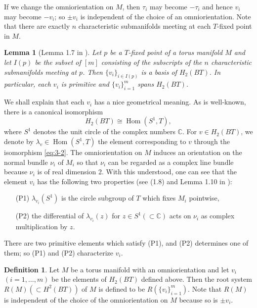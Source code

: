 \documentclass[12pt]{amsart}
\theoremstyle{plain} \numberwithin{equation}{section}
\newtheorem{lemm}[theo]{Lemma}
\theoremstyle{definition}
\newtheorem{defi}[theo]{Definition}
\def\C{\mathbb C}
\DeclareMathOperator{\Hom}{Hom}
\begin{document}
If we change the omniorientation on $M$, then $\tau_i$ may become $-\tau_i$ and hence $v_i$ may become $-v_i$; so $\pm v_i$ is independent of the choice of an omniorientation. 
Note that there are exactly $n$ characteristic submanifolds meeting at each $T$-fixed point in $M$.  

\begin{lemm} [Lemma 1.7 in \cite{masu99}] \label{lemm:3-1-1}
Let $p$ be a $T$-fixed point of a torus manifold $M$ and let $I(p)$ be the subset of $[m]$ consisting of the subscripts of the $n$ characteristic submanifolds meeting at $p$.  Then $\{ v_i\}_{i\in I(p)}$ is a basis of $H_2(BT)$.  In particular, each $v_i$ is primitive and $\{v_i\}_{i=1}^m$ spans $H_2(BT)$.
\end{lemm}  

We shall explain that each $v_i$ has a nice geometrical meaning.  As is well-known, there is a canonical isomorphism 
\begin{equation} \label{eq:3-2}
H_2(BT)\cong \Hom(S^1,T),
\end{equation}
where $S^1$ denotes the unit circle of the complex numbers $\C$. For $v\in H_2(BT)$, we denote by $\lambda_v\in \Hom(S^1,T)$ the element corresponding to $v$ through the isomorphism \eqref{eq:3-2}. The omniorientation on $M$ induces an orientation on the normal bundle $\nu_i$ of $M_i$ so that $\nu_i$ can be regarded as a complex line bundle because $\nu_i$ is of real dimension 2.  With this understood, one can see that the element $v_i$ has the following two properties (see (1.8) and Lemma 1.10 in \cite{masu99}): 
\begin{enumerate}
\item[(P1)] $\lambda_{v_i}(S^1)$ is the circle subgroup of $T$ which fixes $M_i$ pointwise, 
\item[(P2)] the differential of $\lambda_{v_i}(z)$ for $z\in S^1(\subset \C)$ acts on $\nu_i$ as complex multiplication by $z$. 
\end{enumerate}
There are two primitive elements which satisfy (P1), and (P2) determines one of them; so (P1) and (P2) characterize $v_i$.  

\begin{defi} \label{defi:3-1}
Let $M$ be a torus manifold with an omniorientation and let $v_i$ $(i=1,\dots,m)$ be the elements of $H_2(BT)$ defined above.  Then the root system $R(M)(\subset H^{2}(BT))$ of $M$ is defined to be $R(\{v_i\}_{i=1}^m)$.  Note that $R(M)$ is independent of the choice of the omniorientation on $M$ because so is $\pm v_i$.  
\end{defi}
\end{document}
